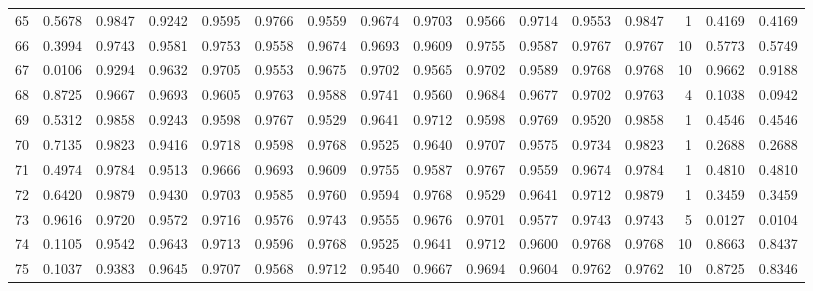 \begin{tabular}{lrrrrrrrrrrrrrrr}
65  &      0.5678 &  0.9847 &  0.9242 &  0.9595 &  0.9766 &  0.9559 &  0.9674 &  0.9703 &  0.9566 &  0.9714 &   0.9553 &     0.9847 &      1 &                    0.4169 &                     0.4169 \\
66  &      0.3994 &  0.9743 &  0.9581 &  0.9753 &  0.9558 &  0.9674 &  0.9693 &  0.9609 &  0.9755 &  0.9587 &   0.9767 &     0.9767 &     10 &                    0.5773 &                     0.5749 \\
67  &      0.0106 &  0.9294 &  0.9632 &  0.9705 &  0.9553 &  0.9675 &  0.9702 &  0.9565 &  0.9702 &  0.9589 &   0.9768 &     0.9768 &     10 &                    0.9662 &                     0.9188 \\
68  &      0.8725 &  0.9667 &  0.9693 &  0.9605 &  0.9763 &  0.9588 &  0.9741 &  0.9560 &  0.9684 &  0.9677 &   0.9702 &     0.9763 &      4 &                    0.1038 &                     0.0942 \\
69  &      0.5312 &  0.9858 &  0.9243 &  0.9598 &  0.9767 &  0.9529 &  0.9641 &  0.9712 &  0.9598 &  0.9769 &   0.9520 &     0.9858 &      1 &                    0.4546 &                     0.4546 \\
70  &      0.7135 &  0.9823 &  0.9416 &  0.9718 &  0.9598 &  0.9768 &  0.9525 &  0.9640 &  0.9707 &  0.9575 &   0.9734 &     0.9823 &      1 &                    0.2688 &                     0.2688 \\
71  &      0.4974 &  0.9784 &  0.9513 &  0.9666 &  0.9693 &  0.9609 &  0.9755 &  0.9587 &  0.9767 &  0.9559 &   0.9674 &     0.9784 &      1 &                    0.4810 &                     0.4810 \\
72  &      0.6420 &  0.9879 &  0.9430 &  0.9703 &  0.9585 &  0.9760 &  0.9594 &  0.9768 &  0.9529 &  0.9641 &   0.9712 &     0.9879 &      1 &                    0.3459 &                     0.3459 \\
73  &      0.9616 &  0.9720 &  0.9572 &  0.9716 &  0.9576 &  0.9743 &  0.9555 &  0.9676 &  0.9701 &  0.9577 &   0.9743 &     0.9743 &      5 &                    0.0127 &                     0.0104 \\
74  &      0.1105 &  0.9542 &  0.9643 &  0.9713 &  0.9596 &  0.9768 &  0.9525 &  0.9641 &  0.9712 &  0.9600 &   0.9768 &     0.9768 &     10 &                    0.8663 &                     0.8437 \\
75  &      0.1037 &  0.9383 &  0.9645 &  0.9707 &  0.9568 &  0.9712 &  0.9540 &  0.9667 &  0.9694 &  0.9604 &   0.9762 &     0.9762 &     10 &                    0.8725 &                     0.8346 \\

\end{tabular}
